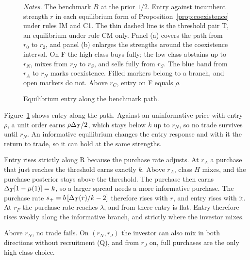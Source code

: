 \begin{figure}[tbp]
\centering
{}
\caption{Equilibrium entry along the benchmark path.}\label{fig:coexistence}
\par\medskip
\begin{minipage}{\linewidth}\footnotesize\singlespacing
\textit{Notes.} The benchmark \(B\) at the prior \(1/2\). Entry against incumbent strength \(r\) in each equilibrium
form of Proposition~\ref{prop:coexistence} under rules IM and C1. The thin dashed line is the threshold pair T, an
equilibrium under rule CM only. Panel (a) covers the path from \(r_0\) to \(r_2\), and panel (b) enlarges the
strengths around the coexistence interval. On F the high class buys fully; the low class abstains up to \(r_N\),
mixes from \(r_N\) to \(r_S\), and sells fully from \(r_S\). The blue band from \(r_A\) to \(r_N\) marks
coexistence. Filled markers belong to a branch, and open markers do not. Above \(r_C\), entry on F equals \(\rho\).
\end{minipage}
\end{figure}

Figure~\ref{fig:coexistence} shows entry along the path. Against an uninformative price with entry \(\rho\), a
unit order earns \(\rho\Delta_T/2\), which stays below \(k\) up to \(r_N\), so no trade survives until \(r_N\). An
informative equilibrium changes the entry response and with it the return to trade, so it can hold at the same
strengths.

Entry rises strictly along R because the purchase rate adjusts. At \(r_A\) a purchase that just reaches the
threshold earns exactly \(k\). Above \(r_A\), class \(H\) mixes, and the purchase posterior stays above the
threshold. The purchase then earns \(\Delta_T[1-\mu(1)]=k\), so a larger spread needs a more informative purchase. The
purchase rate \(s_+=b\,[\Delta_T(r)/k-2]\) therefore rises with \(r\), and entry rises with it. At \(r_F\) the purchase
rate reaches \(\lambda\), and from there entry is flat. Entry therefore rises weakly along the informative branch,
and strictly where the investor mixes.

Above \(r_N\), no trade fails. On \((r_N,r_J)\) the investor can also mix in both directions without recruitment
(Q), and from \(r_J\) on, full purchases are the only high-class choice.

